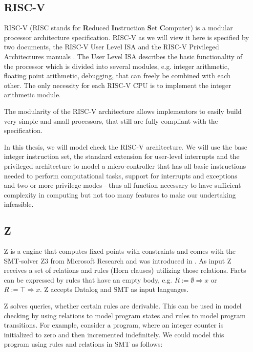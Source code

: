 \documentclass{securem}
\newcommand{\muZ}{{\textmu}Z}
\begin{document}
\subsection{RISC-V}

RISC-V (RISC stands for \textbf{R}educed \textbf{I}nstruction \textbf{S}et \textbf{C}omputer) is a modular processor architecture specification.
RISC-V as we will view it here is specified by two documents, the RISC-V User Level ISA \cite{RiscVISA} and the RISC-V Privileged Architectures manuals \cite{RiscVISAP}.
The User Level ISA describes the basic functionality of the processor which is divided into several modules, e.g. integer arithmetic, floating point arithmetic, debugging, that can freely be combined with each other.
The only necessity for each RISC-V CPU is to implement the integer arithmetic module.

The modularity of the RISC-V architecture allows implementors to easily build very simple and small processors, that still are fully compliant with the specification.

In this thesis, we will model check the RISC-V architecture.
We will use the base integer instruction set, the standard extension for user-level interrupts and the privileged architecture to model a micro-controller that has all basic instructions needed to perform computational tasks, support for interrupts and exceptions and two or more privilege modes - thus all function necessary to have sufficient complexity in computing but not too many features to make our undertaking infeasible.

\subsection{\muZ{}}

\muZ{} is a engine that computes fixed points with constraints and comes with the SMT-solver Z3 from Microsoft Research and was introduced in \cite{Hoder11}.
As input \muZ{} receives a set of relations and rules (Horn clauses) utilizing those relations.
Facts can be expressed by rules that have an empty body, e.g. $ R := \emptyset \Rightarrow x $ or $ R := \top \Rightarrow x $.
\muZ{} accepts Datalog and SMT as input languages.

\muZ{} solves queries, whether certain rules are derivable.
This can be used in model checking by using relations to model program states and rules to model program transitions.
For example, consider a program, where an integer counter is initialized to zero and then incremented indefinitely.
We could model this program using rules and relations in SMT as follows:
\end{document}
